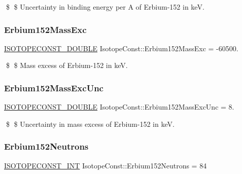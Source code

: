 \$ \$ Uncertainty in binding energy per A of Erbium-\/152 in keV. \mbox{\label{group___isotope_const-_erbium-_er152_gad27997ccee657ea28ea4e16238effaf5}} 
\subsubsection{\texorpdfstring{Erbium152\+Mass\+Exc}{Erbium152MassExc}}
{\footnotesize\ttfamily \mbox{\hyperlink{group___isotope_const-_macros_ga8f45a7272ce02c0b4c65c44636ed719a}{I\+S\+O\+T\+O\+P\+E\+C\+O\+N\+S\+T\+\_\+\+D\+O\+U\+B\+LE}} Isotope\+Const\+::\+Erbium152\+Mass\+Exc = -\/60500.}

\$ \$ Mass excess of Erbium-\/152 in keV. \mbox{\label{group___isotope_const-_erbium-_er152_gaca1414075a0f0d669681da3fc8cc507f}} 
\subsubsection{\texorpdfstring{Erbium152\+Mass\+Exc\+Unc}{Erbium152MassExcUnc}}
{\footnotesize\ttfamily \mbox{\hyperlink{group___isotope_const-_macros_ga8f45a7272ce02c0b4c65c44636ed719a}{I\+S\+O\+T\+O\+P\+E\+C\+O\+N\+S\+T\+\_\+\+D\+O\+U\+B\+LE}} Isotope\+Const\+::\+Erbium152\+Mass\+Exc\+Unc = 8.}

\$ \$ Uncertainty in mass excess of Erbium-\/152 in keV. \mbox{\label{group___isotope_const-_erbium-_er152_gaba86e3677e887bbb37119656ceed2b45}} 
\subsubsection{\texorpdfstring{Erbium152\+Neutrons}{Erbium152Neutrons}}
{\footnotesize\ttfamily \mbox{\hyperlink{group___isotope_const-_macros_ga5f18360b3e99483a35c32d789e62621c}{I\+S\+O\+T\+O\+P\+E\+C\+O\+N\+S\+T\+\_\+\+I\+NT}} Isotope\+Const\+::\+Erbium152\+Neutrons = 84}

